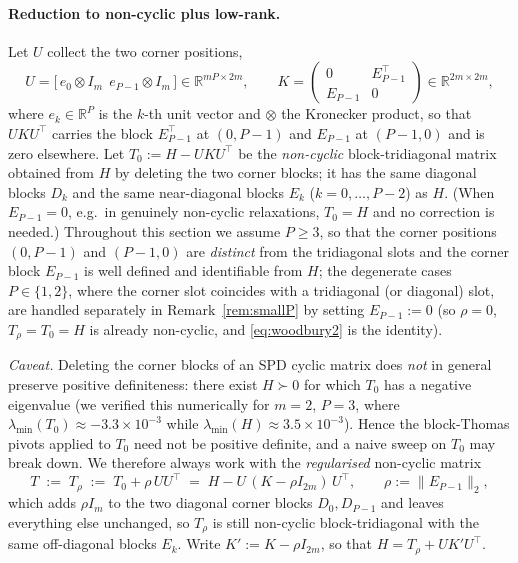\documentclass{amsart}
\newcommand{\R}{\mathbb{R}}
\begin{document}
\paragraph{Reduction to non-cyclic plus low-rank.}
Let $U$ collect the two corner positions,
\begin{equation}\label{eq:UKV}
  U=\big[\,e_{0}\otimes I_m\ \ e_{P-1}\otimes I_m\,\big]\in\R^{mP\times2m},
  \qquad
  K=\begin{pmatrix}0 & E_{P-1}^{\!\top}\\ E_{P-1} & 0\end{pmatrix}\in\R^{2m\times2m},
\end{equation}
where $e_k\in\R^{P}$ is the $k$-th unit vector and $\otimes$ the Kronecker product,
so that $UKU^{\!\top}$ carries the block $E_{P-1}^{\!\top}$ at $(0,P-1)$ and $E_{P-1}$
at $(P-1,0)$ and is zero elsewhere. Let $T_0:=H-UKU^{\!\top}$ be the \emph{non-cyclic}
block-tridiagonal matrix obtained from $H$ by deleting the two corner blocks; it has
the same diagonal blocks $D_k$ and the same near-diagonal blocks $E_k$
($k=0,\dots,P-2$) as $H$. (When $E_{P-1}=0$, e.g.\ in genuinely non-cyclic
relaxations, $T_0=H$ and no correction is needed.) Throughout this section we assume
$P\ge3$, so that the corner positions $(0,P-1)$ and $(P-1,0)$ are \emph{distinct}
from the tridiagonal slots and the corner block $E_{P-1}$ is well defined and
identifiable from $H$; the degenerate cases $P\in\{1,2\}$, where the corner slot
coincides with a tridiagonal (or diagonal) slot, are handled separately in
Remark~\ref{rem:smallP} by setting $E_{P-1}:=0$ (so $\rho=0$, $T_\rho=T_0=H$ is
already non-cyclic, and \eqref{eq:woodbury2} is the identity).

\emph{Caveat.} Deleting the corner blocks of an SPD cyclic matrix does \emph{not} in
general preserve positive definiteness: there exist $H\succ0$ for which $T_0$ has a
negative eigenvalue (we verified this numerically for $m=2$, $P=3$, where
$\lambda_{\min}(T_0)\approx-3.3\times10^{-3}$ while $\lambda_{\min}(H)\approx
3.5\times10^{-3}$). Hence the block-Thomas pivots applied to $T_0$ need not be
positive definite, and a naive sweep on $T_0$ may break down. We therefore always
work with the \emph{regularised} non-cyclic matrix
\begin{equation}\label{eq:Trho}
  T \;:=\; T_\rho \;:=\; T_0+\rho\,UU^{\!\top}
        \;=\; H - U\,(K-\rho I_{2m})\,U^{\!\top},
  \qquad \rho:=\|E_{P-1}\|_2,
\end{equation}
which adds $\rho I_m$ to the two diagonal corner blocks $D_0,D_{P-1}$ and leaves
everything else unchanged, so $T_\rho$ is still non-cyclic block-tridiagonal with the
same off-diagonal blocks $E_k$. Write $K':=K-\rho I_{2m}$, so that
$H=T_\rho+UK'U^{\!\top}$.
\end{document}
